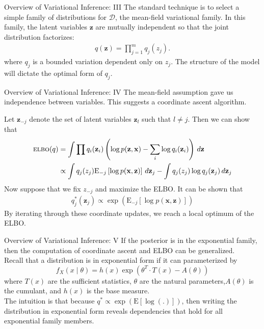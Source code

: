 \documentclass{beamer}
\newcommand{\bx}{\ensuremath{\mathbf{x}}}
\newcommand{\bz}{\ensuremath{\mathbf{z}}}
\newcommand{\E}{\mathrm{E}}
\newcommand{\ELBO}{\textsc{elbo}}
\begin{document}
\begin{frame}{Overview of Variational Inference: III}
The standard technique is to select a simple family of distributions for $\mathcal{D}$, the mean-field variational family. In this family, the latent variables $\bz$ are mutually independent so that the joint distribution factorizes:
\begin{align*}
  q(\bz) = \prod_{j=1}^{m} q_j(z_j).
\end{align*}
where $q_j$ is a bounded variation dependent only on $z_j$. The structure of the model will dictate the optimal form of $q_j$. 
\end{frame}

\begin{frame}{Overview of Variational Inference: IV}
The mean-field assumption gave us independence between variables. This suggests a coordinate ascent algorithm. \pause

\medskip
Let $\bz_{-j}$ denote the set of latent variables $\bz_l$ such that $l \neq j$. Then we can show that
	 \begin{align*}
\ELBO(q) &= \int \prod q_i(\bz_i) \left(\log p(\bz, \bx) - \sum_i \log q_i(\bz_i) \right) \,d\bz \nonumber \\
			&\propto \int q_j(z_j) \E_{-j}\left[\log p(\bx, \bz) \right] \, d\bz_j - \int q_j(z_j) \log q_j(\bz_j) \, d\bz_j
\end{align*}
\pause
Now suppose that we fix $z_{-j}$ and maximize the \textsc{ELBO}. It can be shown that 
\begin{align*}
q^*_j(\bz_j) \propto \exp\left(\E_{-j}\left[\log p(\bx, \bz) \right]\right)
\end{align*}
\pause
By iterating through these coordinate updates, we reach a local optimum of the \textsc{ELBO}.
\medskip
\end{frame}

\begin{frame}{Overview of Variational Inference: V}
If the posterior is in the exponential family, then the computation of coordinate ascent and ELBO can be generalized. \\[10pt]
\pause
Recall that a distribution is in exponential form if it can parameterized by 
\begin{equation*}
f_X(x\mid\theta) = h(x) \exp \left (\theta^T \cdot T(x) -A(\theta)\right )
\end{equation*}
where $T(x)$ are the sufficient statistics, $\theta$ are the natural parameters,$A(\theta)$ is the cumulant, and $h(x)$ is the base measure. 
\\[10pt]
\pause
The intuition is that because $q^* \propto \exp(\E[\log(.)])$, then writing the distribution in exponential form reveals dependencies that hold for all exponential family members.
\end{frame}
\end{document}
